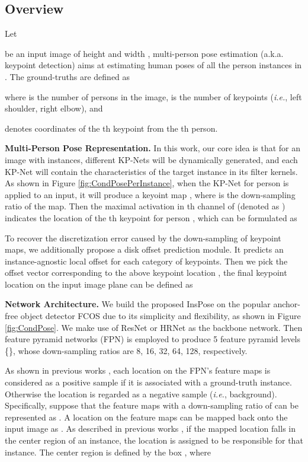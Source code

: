 \documentclass[sigconf]{acmart}
\begin{document}
\subsection{Overview}

Let

be an input image of height  and width , multi-person pose estimation (a.k.a. keypoint detection) aims at estimating human poses  of all the person instances in . The ground-truths are defined as

where  is the number of persons in the image,  is the number of keypoints (\textit{i.e.}, left shoulder, right elbow), and

denotes coordinates of the th keypoint from the th person.

\textbf{Multi-Person Pose Representation.}\quad
In this work, our core idea is that for an image with  instances,  different KP-Nets will be dynamically generated, and each KP-Net will contain the characteristics of the target instance in its filter kernels.
As shown in Figure \ref{fig:CondPosePerInstance}, when the KP-Net for person  is applied to an input, it will produce a keyoint map , where  is the down-sampling ratio of the map. Then the maximal activation in th channel of  (denoted as ) indicates the location of the th keypoint for person , which can be formulated as


To recover the discretization error caused by the down-sampling of keypoint maps, we additionally propose a disk offset prediction module. It predicts an instance-agnostic local offset  for each category of keypoints. Then we pick the offset vector  corresponding to the above keypoint location , the final keypoint location on the input image plane can be defined as


\textbf{Network Architecture.}\quad
We build the proposed InsPose on the popular anchor-free object detector FCOS \cite{tian2019fcos} due to its simplicity and flexibility,
as shown in Figure \ref{fig:CondPose}. We make use of ResNet \cite{he2016deep} or HRNet \cite{sun2019deep} as the backbone network. Then feature pyramid networks (FPN) \cite{lin2017feature} is employed to produce 5 feature pyramid levels \{\}, whose down-sampling ratios are 8, 16, 32, 64, 128, respectively.

As shown in previous works \cite{ren2015faster, he2015spatial}, each location on the FPN's feature maps is considered as a positive sample if it is associated with a ground-truth instance. Otherwise the location is regarded as a negative sample (\emph{i.e.}, background).
Specifically, suppose that the feature maps with a down-sampling ratio of  can be represented as
.
A location  on the feature maps  can be mapped back onto the input image as
.
As described in previous works \cite{tian2019fcos, tian2020conditional}, 
if the mapped location falls in the center region of an instance, the location is assigned to be responsible for that instance.
The center region is defined by the box
, where
\end{document}
